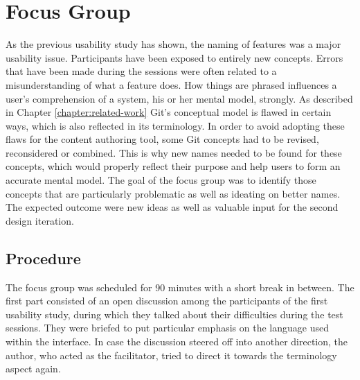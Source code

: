 \chapter{Focus Group} \label{chapter:focus-group}
As the previous usability study has shown, the naming of features was a major usability issue. Participants have been exposed to entirely new concepts. Errors that have been made during the sessions were often related to a misunderstanding of what a feature does. How things are phrased influences a user’s comprehension of a system, his or her mental model, strongly. As described in Chapter \ref{chapter:related-work} Git's conceptual model is flawed in certain ways, which is also reflected in its terminology. In order to avoid adopting these flaws for the content authoring tool, some Git concepts had to be revised, reconsidered or combined. This is why new names needed to be found for these concepts, which would properly reflect their purpose and help users to form an accurate mental model. The goal of the focus group was to identify those concepts that are particularly problematic as well as ideating on better names. The expected outcome were new ideas as well as valuable input for the second design iteration.





\section{Procedure}
The focus group was scheduled for 90 minutes with a short break in between. The first part consisted of an open discussion among the participants of the first usability study, during which they talked about their difficulties during the test sessions. They were briefed to put particular emphasis on the language used within the interface. In case the discussion steered off into another direction, the author, who acted as the facilitator, tried to direct it towards the terminology aspect again.

